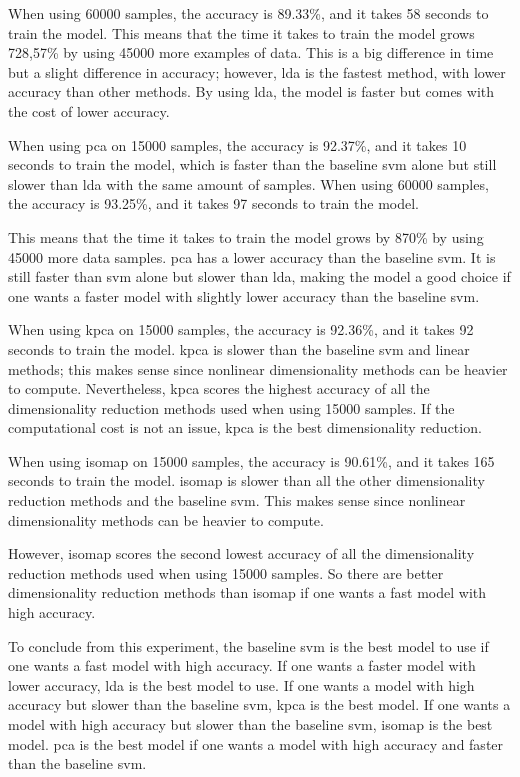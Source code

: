 When using 60000 samples, the accuracy is 89.33\%, and it takes 58 seconds to train the model. This means that the time it takes to train the model grows 728,57\% by using 45000 more examples of data. This is a big difference in time but a slight difference in accuracy; however, \gls{lda} is the fastest method, with lower accuracy than other methods. By using \gls{lda}, the model is faster but comes with the cost of lower accuracy.

When using \gls{pca} on 15000 samples, the accuracy is 92.37\%, and it takes 10 seconds to train the model, which is faster than the baseline \gls{svm} alone but still slower than \gls{lda} with the same amount of samples. When using 60000 samples, the accuracy is 93.25\%, and it takes 97 seconds to train the model.

This means that the time it takes to train the model grows by 870\% by using 45000 more data samples. \gls{pca} has a lower accuracy than the baseline \gls{svm}. It is still faster than \gls{svm} alone but slower than \gls{lda}, making the model a good choice if one wants a faster model with slightly lower accuracy than the baseline \gls{svm}.

When using \gls{kpca} on 15000 samples, the accuracy is 92.36\%, and it takes 92 seconds to train the model. \gls{kpca} is slower than the baseline \gls{svm} and linear methods; this makes sense since nonlinear dimensionality methods can be heavier to compute. Nevertheless, \gls{kpca} scores the highest accuracy of all the dimensionality reduction methods used when using 15000 samples. If the computational cost is not an issue, \gls{kpca} is the best dimensionality reduction.

When using \gls{isomap} on 15000 samples, the accuracy is 90.61\%, and it takes 165 seconds to train the model. \gls{isomap} is slower than all the other dimensionality reduction methods and the baseline \gls{svm}. This makes sense since nonlinear dimensionality methods can be heavier to compute.

However, \gls{isomap} scores the second lowest accuracy of all the dimensionality reduction methods used when using 15000 samples. So there are better dimensionality reduction methods than \gls{isomap} if one wants a fast model with high accuracy.

To conclude from this experiment, the baseline \gls{svm} is the best model to use if one wants a fast model with high accuracy. If one wants a faster model with lower accuracy, \gls{lda} is the best model to use. If one wants a model with high accuracy but slower than the baseline \gls{svm}, \gls{kpca} is the best model. If one wants a model with high accuracy but slower than the baseline \gls{svm}, \gls{isomap} is the best model. \gls{pca} is the best model if one wants a model with high accuracy and faster than the baseline \gls{svm}.

